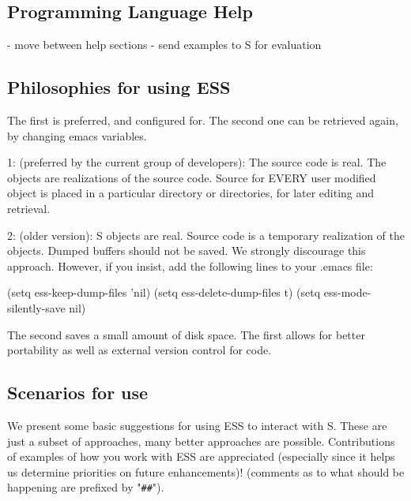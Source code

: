\documentclass{article}
\begin{document}
\subsection{Programming Language Help}
\label{sec:basic:help}


- move between help sections
- send examples to S for evaluation


\subsection{Philosophies for using ESS}
\label{sec:basic:philosophy}


The first is preferred, and configured for.  The second one can be
retrieved again, by changing emacs variables.

1: (preferred by the current group of developers):  The source code is 
   real.  The objects are realizations of the source code.  Source
   for EVERY user modified object is placed in a particular directory
   or directories, for later editing and retrieval.

2: (older version): S objects are real.  Source code is a temporary
   realization of the objects.  Dumped buffers should not be saved.
   We strongly discourage this approach.  However, if you insist,
   add the following lines to your .emacs file:

      (setq ess-keep-dump-files 'nil)
      (setq ess-delete-dump-files t)
      (setq ess-mode-silently-save nil)

The second saves a small amount of disk space.  The first allows for
better portability as well as external version control for code.


\subsection{Scenarios for use}
\label{sec:basic:scenarios}

We present some basic suggestions for using ESS to interact with S.
These are just a subset of approaches, many better approaches are
possible.  Contributions of examples of how you work with ESS are
appreciated (especially since it helps us determine priorities on
future enhancements)! (comments as to what should be happening are
prefixed by "\verb+##+").
\end{document}
